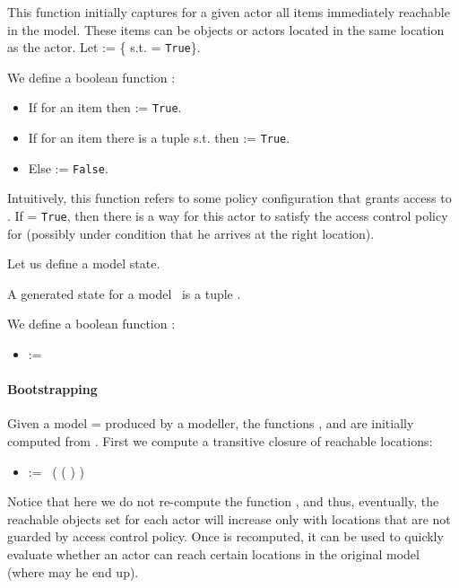 \documentclass{llncs}
\begin{document}
This function initially captures for a given actor all items immediately reachable in the model. These items can be objects or actors located in the same location as the actor. Let  := \{ s.t.  = \texttt{True}\}.


\begin{definition}[\Granted{}{}]
We define a boolean function \Granted{}{}    :
\begin{itemize}
\item If for an item   then  := \texttt{True}.
\item If for an item  there is a tuple   s.t.  then  := \texttt{True}.
\item Else  := \texttt{False}.
\end{itemize}
\end{definition}

Intuitively, this function refers to some policy configuration that grants access to . If  = \texttt{True}, then there is a way for this actor to satisfy the access control policy for  (possibly under condition that he arrives at the right location). 

Let us define a model state.
\begin{definition}[State]
A generated state for a model \model\ is a tuple .	 
\end{definition}

\begin{definition}[\Accessible{}{}]
We define a boolean function \Accessible{}{}    :
\begin{itemize}
\item {} :=  \AND\ 
\end{itemize}

	
\end{definition}



\paragraph{Bootstrapping}
Given a model \model=  produced by a modeller, the functions \Reachable{}{}, \Granted{}{} and \Accessible{}{} are initially computed from \model. First we compute a transitive closure of reachable locations:
\begin{itemize}
\item {} 	:=  \OR\ (  \AND ( \OR ) )
\end{itemize}
Notice that here we do not re-compute the function \Granted{}{}, and thus, eventually, the reachable objects set for each actor will increase only with locations that are not guarded by access control policy. Once \Reachable{}{} is recomputed, it can be used to quickly evaluate whether an actor can reach certain locations in the original model (where may he end up). 
\end{document}
